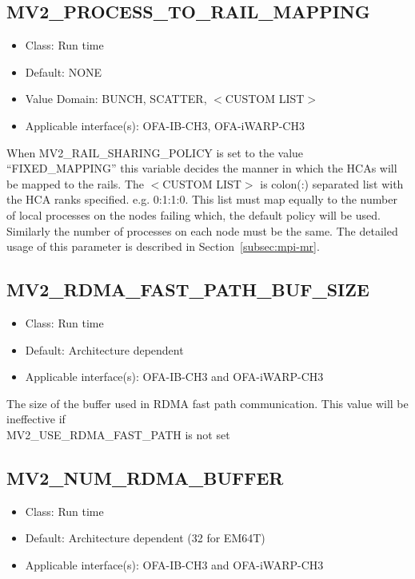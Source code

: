 \subsection{MV2\_PROCESS\_TO\_RAIL\_MAPPING}
\label{def:process-to-rail-mapping}
\begin{itemize}
    \item Class: Run time
    \item Default: NONE
    \item Value Domain: BUNCH, SCATTER, $<$CUSTOM LIST$>$
    \item Applicable interface(s): OFA-IB-CH3, OFA-iWARP-CH3
\end{itemize}
When MV2\_RAIL\_SHARING\_POLICY is set to the value ``FIXED\_MAPPING'' this variable 
decides the manner in which the HCAs will be mapped to the rails. The $<$CUSTOM LIST$>$ 
is colon(:) separated list with the HCA ranks specified. e.g. 0:1:1:0. This list must 
map equally to	the number of local processes on the nodes failing which, the default 
policy will be used. Similarly the number of processes on each node must be the
same. The detailed usage of this parameter is described in
Section~\ref{subsec:mpi-mr}.


\subsection{MV2\_RDMA\_FAST\_PATH\_BUF\_SIZE}
\label{def:rdma-fast-path-buf-size}

\begin{itemize}
    \item Class: Run time

    \item Default: Architecture dependent
    \item Applicable interface(s): OFA-IB-CH3 and OFA-iWARP-CH3

\end{itemize}

The size of the buffer used in RDMA fast path communication. 
This value will be ineffective if \\
MV2\_USE\_RDMA\_FAST\_PATH is not set

\subsection{MV2\_NUM\_RDMA\_BUFFER}
\label{def:num-rdma-buffer}

\begin{itemize}
    \item Class: Run time

    \item Default: Architecture dependent (32 for EM64T)
    \item Applicable interface(s): OFA-IB-CH3 and OFA-iWARP-CH3
\end{itemize}

